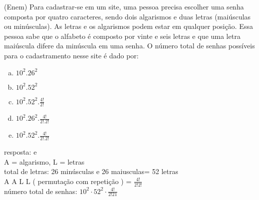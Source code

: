 \begin{ex}
  (Enem) Para cadastrar-se em um site, uma pessoa precisa escolher uma senha composta por quatro caracteres, sendo dois algarismos e duas letras (maiúsculas ou minúsculas). As letras e os algarismos podem estar em qualquer posição. Essa pessoa sabe que o alfabeto é composto por vinte e seis letras e que uma letra maiúscula difere da minúscula em uma senha.
  O número total de senhas possíveis para o cadastramento nesse site é dado por:
    \begin{enumerate} [(a)]
        \item ${10}^2 . {26}^2$
        \item ${10}^2 . {52} ^2$
        \item ${10}^2 . {52} ^2 . \frac{4!}{2!}$
        \item ${10}^2 . {26} ^2 . \frac{4!}{2! . 2!}$
        \item ${10}^2 . {52}^2 . \frac{4!}{2! . 2!}$
    \end{enumerate}
     \begin{sol}
      resposta: e \\
      A = algarismo, L = letras \\
      total de letras: 26 minúsculas e 26 maiusculas= 52 letras \\
      A A L L ( permutação com repetição ) =  $\frac{4!}{2!2!}$ \\
      número total de senhas: $10^2\cdot52^2\cdot\frac{4!}{2!21}$
     \end{sol}
 \end{ex}